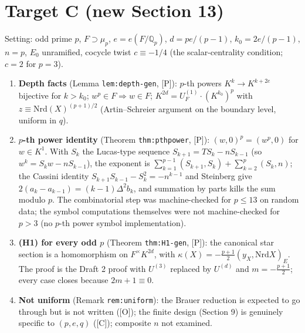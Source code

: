 \documentclass[11pt]{article}
\newcommand{\Q}{\mathbb Q}
\begin{document}
\section*{Target C (new Section 13)}
Setting: odd prime $p$, $F\supset\mu_p$, $e=e(F/\Q_p)$, $d=pe/(p-1)$,
$k_0=2e/(p-1)$, $n=p$, $E_0$ unramified, cocycle twist $c\equiv-1/4$ (the
scalar-centrality condition; $c=2$ for $p=3$).
\begin{enumerate}[leftmargin=*]
\item \textbf{Depth facts} (Lemma \texttt{lem:depth-gen}, [P]): $p$-th
powers $K^k\to K^{k+2e}$ bijective for $k>k_0$; $w^p\in F\Rightarrow w\in F$;
$K^{2d}=U_F^{(1)}\cdot(K^{k_0})^p$ with $z\equiv\mathrm{Nrd}(X)^{(p+1)/2}$
(Artin--Schreier argument on the boundary level, uniform in $q$).
\item \textbf{$p$-th power identity} (Theorem \texttt{thm:pthpower}, [P]):
$(w,0)^p=(w^p,0)$ for $w\in K^1$.  With $S_k$ the Lucas-type sequence
$S_{k+1}=TS_k-nS_{k-1}$ (so $w^k=S_kw-nS_{k-1}$), the exponent is
$\sum_{k=1}^{p-1}(S_{k+1},S_k)+\sum_{k=2}^p(S_k,n)$; the Cassini identity
$S_{k+1}S_{k-1}-S_k^2=-n^{k-1}$ and Steinberg give
$2(a_k-a_{k-1})=(k-1)\Delta^2b_k$, and summation by parts kills the sum
modulo $p$.  The combinatorial step was machine-checked for
$p\le13$ on random data; the symbol computations themselves were not
machine-checked for $p>3$ (no $p$-th power symbol implementation).
\item \textbf{(H1) for every odd $p$} (Theorem \texttt{thm:H1-gen}, [P]):
the canonical star section is a homomorphism on $F^\times K^{2d}$, with
$\kappa(X)=-\frac{p+1}{2}(y_X,\mathrm{Nrd}X)_E$.  The proof is the Draft 2
proof with $U^{(3)}$ replaced by $U^{(d)}$ and $m=-\frac{p+1}{2}$; every
case closes because $2m+1\equiv0$.
\item \textbf{Not uniform} (Remark \texttt{rem:uniform}): the Brauer
reduction is expected to go through but is not written ([O]); the finite
design (Section 9) is genuinely specific to $(p,e,q)$ ([C]); composite
$n$ not examined.
\end{enumerate}
\end{document}

